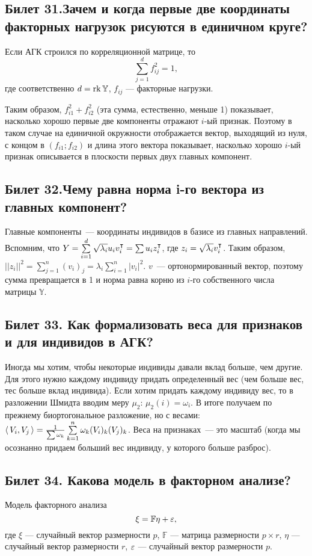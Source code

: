 \subsection{Билет 31.Зачем и когда первые две координаты факторных нагрузок рисуются в единичном круге?}
Если АГК строился по корреляционной матрице, то 
\begin{equation}
\sum\limits_{j = 1}^{d} f^2_{ij} = 1, 
\end{equation}
где соответственно $d = \operatorname{rk} \mathbb{Y}$, $f_{ij}$ --- факторные нагрузки.

Таким образом, $f^2_{i1} + f^2_{i2}$ (эта сумма, естественно, меньше 1) показывает, насколько хорошо первые две компоненты отражают $i$-ый признак.
Поэтому в таком случае на единичной окружности отображается вектор, выходящий из нуля, с концом в $(f_{i1};f_{i2})$ и длина этого вектора показывает, насколько хорошо $i$-ый признак описывается в плоскости первых двух главных компонент.

\subsection{Билет 32.Чему равна норма i-го вектора из главных компонент?}
Главные компоненты — координаты индивидов в базисе из главных направлений. Вспомним, что $Y = \sum\limits_{i=1}^d \sqrt{\lambda_i} u_i v_i^{\intercal} = \sum u_i z_i^{\intercal}$, где $z_i = \sqrt{\lambda_i}v_i^{\intercal}$.
Таким образом, $||z_i||^2 = \sum\limits_{j=1}^{n} (v_i)_j = \lambda_i \sum \limits_{i=1}^{n}|v_i|^2$. $v$ — ортонормированный вектор, поэтому сумма превращается в 1 и норма равна корню из $i$-го собственного числа матрицы $\mathbb{Y}$.

\subsection{Билет 33. Как формализовать веса для признаков и для индивидов в АГК?}
Иногда мы хотим, чтобы некоторые индивиды давали вклад больше, чем другие. Для этого нужно каждому индивиду придать определенный вес (чем больше вес, тес больше вклад индивида). 
Если хотим придать каждому индивиду вес, то в разложении Шмидта вводим меру $\mu_2$: $\mu_2({i})=\omega_i$. В итоге получаем по прежнему биортогональное разложение, но с весами:
$\langle\,V_i, V_j\,\rangle =\frac{1}{\sum\omega_k}\sum\limits_{k=1}^{n} \omega_k (V_i)_k(V_j)_k$. 
Веса на признаках — это масштаб (когда мы осознанно придаем больший вес индивиду, у которого больше разброс).

\subsection{Билет 34. Какова модель в факторном анализе?}
Модель факторного анализа
\begin{equation*}
\xi = \mathbb{F}\eta + \varepsilon, 
\end{equation*}
где $\xi$ --- случайный вектор размерности $p$,
$\mathbb{F}$ --- матрица размерности $p \times r$, 
$\eta$ ---случайный вектор размерности $r$, $\varepsilon$ --- случайный вектор размерности $p$. 

